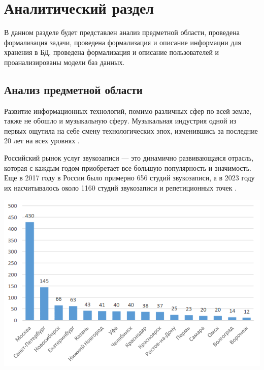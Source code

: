 
\chapter{Аналитический раздел}
В данном разделе будет представлен анализ предметной области, проведена формализация задачи, проведена формализация и описание информации для хранения в БД, проведена формализация и описание пользователей и проанализированы модели баз данных. 
\section{Анализ предметной области}
Развитие информационных технологий, помимо различных сфер по всей земле, также не обошло и музыкальную сферу.
Музыкальная индустрия одной из первых ощутила на себе смену технологических эпох, изменившись за последние 20 лет на всех уровнях \cite{music_and_it}.

Российский рынок услуг звукозаписи --- это динамично развивающаяся отрасль, которая с каждым годом приобретает все большую популярность и значимость.
Еще в 2017 году в России было примерно 656 студий звукозаписи, а в 2023 году их насчитывалось около 1160 студий звукозаписи и репетиционных точек \cite{music_stat}.


\begin{center}
	\centering
	\includegraphics[height=0.3\textheight]{inc/img/stat.png}
	\label{img:stat}
\end{center}


